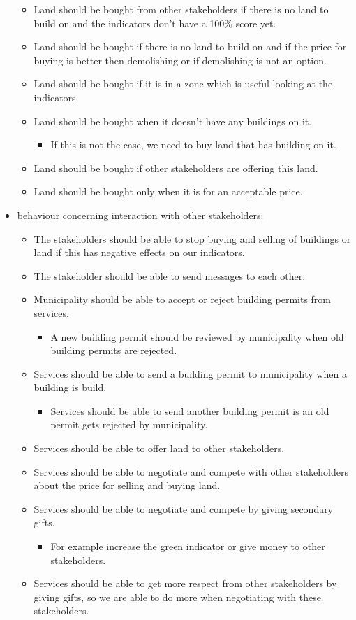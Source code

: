 \begin{itemize}
\begin{itemize}
		\item 	Land should be bought from other stakeholders if there is no land to build on and the indicators don't have a 100$\%$ score yet.
		\item	Land should be bought if there is no land to build on and if the price for buying is better then demolishing or if demolishing is not an option.
		\item	Land should be bought if it is in a zone which is useful looking at the indicators.
		\item	Land should be bought when it doesn't have any buildings on it.
		\begin{itemize}
			\item If this is not the case, we need to buy land that has  building on it.
		\end{itemize}		
		\item	Land should be bought if other stakeholders are offering this land.
		\item	Land should be bought only when it is for an acceptable price.
	\end{itemize}
	\item behaviour concerning interaction with other stakeholders:
	\begin{itemize}
		\item 	The stakeholders should be able to stop buying and selling of buildings or land if this has negative effects on our indicators.
		\item 	The stakeholder should be able to send messages to each other.
		\item 	Municipality should be able to accept or reject building permits from services.
		\begin{itemize}
			\item A new building permit should be reviewed by municipality when old building permits are rejected.
		\end{itemize}
	\item	Services should be able to send a building permit to municipality when a building is build.
	\begin{itemize}
		\item Services should be able to send another building permit is an old permit gets rejected by municipality.
	\end{itemize}	
	\item	Services should be able to offer land to other stakeholders.
	\item	Services should be able to negotiate and compete with other stakeholders about the price for selling and buying land.
	\item 	Services should be able to negotiate and compete by giving secondary gifts.
	\begin{itemize}
		\item For example increase the green indicator or give money to other stakeholders.
	\end{itemize}	
	\item	Services should be able to get more respect from other stakeholders by giving gifts, so we are able to do more when negotiating with these stakeholders.
	\end{itemize}

\end{itemize}


\newpage